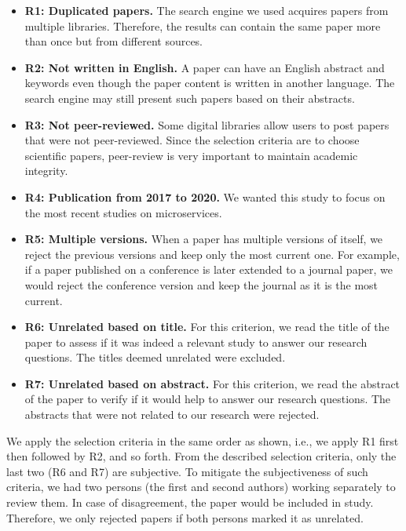 \begin{itemize}
   \item \textbf{R1: Duplicated papers.} The search engine we used acquires papers from multiple libraries. Therefore, the results can contain the same paper more than once but from different sources. %
   \item \textbf{R2: Not written in English.} A paper can have an English abstract and keywords even though the paper content is written in another language. The search engine may still present such papers based on their abstracts.
  \item \textbf{R3: Not peer-reviewed.} Some digital libraries allow users to post papers that were not peer-reviewed. Since the selection criteria are to choose scientific papers,  peer-review is very important to maintain academic integrity. %
   \item \textbf{R4: Publication from 2017 to 2020.} 
We wanted this study to focus on the most recent studies on microservices.
  \item \textbf{R5: Multiple versions.} When a paper has multiple versions of itself, we reject the previous versions and keep only the most current one. For example, if a paper published on a conference is later extended to a journal paper, we would reject the conference version and keep the journal as it is the most current.
  \item \textbf{R6: Unrelated based on title.} For this criterion, we read the title of the paper to assess if it was indeed a relevant study to answer our research questions. The titles deemed unrelated were excluded.
  \item \textbf{R7: Unrelated based on abstract.} For this criterion, we read the abstract of the paper to verify if it would help to answer our research questions. The abstracts that were not related to our research were rejected.  
\end{itemize}


We apply the selection criteria in the same order as shown, i.e., we apply R1 first then followed by R2, and so forth.
From the described selection criteria, only the last two (R6 and R7) are subjective. To mitigate the subjectiveness of such criteria, we had two persons (the first and second authors) working separately to review them. In case of disagreement, the paper would be included in study. Therefore, we only rejected papers if both persons marked it as unrelated.

